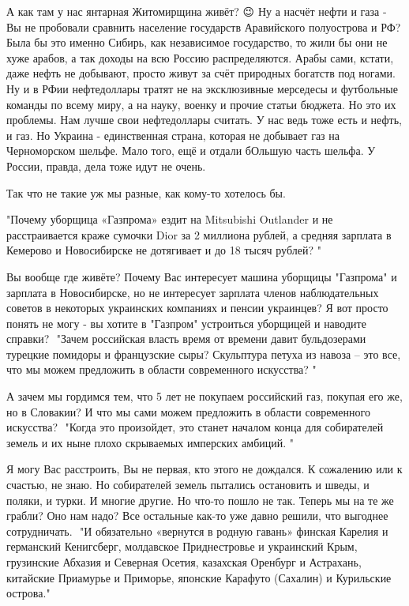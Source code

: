\begin{itemize}
А как там у нас янтарная Житомирщина живёт? 😉 Ну а насчёт нефти и газа - Вы не
пробовали сравнить население государств Аравийского полуострова и РФ? Была бы
это именно Сибирь, как независимое государство, то жили бы они не хуже арабов,
а так доходы на всю Россию распределяются. Арабы сами, кстати, даже нефть не
добывают, просто живут за счёт природных богатств под ногами. Ну и в РФии
нефтедоллары тратят не на эксклюзивные мерседесы и футбольные команды по всему
миру, а на науку, военку и прочие статьи бюджета. Но это их проблемы. Нам лучше
свои нефтедоллары считать. У нас ведь тоже есть и нефть, и газ. Но Украина -
единственная страна, которая не добывает газ на Черноморском шельфе. Мало того,
ещё и отдали бОльшую часть шельфа. У России, правда, дела тоже идут не очень.

Так что не такие уж мы разные, как кому-то хотелось бы.  ⁠

"Почему уборщица «Газпрома» ездит на Mitsubishi Outlander и не расстраивается краже сумочки Dior за 2 миллиона рублей, а средняя зарплата в Кемерово и Новосибирске не дотягивает и до 18 тысяч рублей? "

Вы вообще где живёте? Почему Вас интересует машина уборщицы "Газпрома" и
зарплата в Новосибирске, но не интересует зарплата членов наблюдательных
советов в некоторых украинских компаниях и пенсии украинцев? Я вот просто
понять не могу - вы хотите в "Газпром" устроиться уборщицей и наводите справки?
⁠
"Зачем российская власть время от времени давит бульдозерами турецкие помидоры
и французские сыры? Скульптура петуха из навоза – это все, что мы можем
предложить в области современного искусства? "

А зачем мы гордимся тем, что 5 лет не покупаем российский газ, покупая его же,
но в Словакии? И что мы сами можем предложить в области современного искусства?
⁠
"Когда это произойдет, это станет началом конца для собирателей земель и их
ныне плохо скрываемых имперских амбиций. "

Я могу Вас расстроить, Вы не первая, кто этого не дождался. К сожалению или к
счастью, не знаю. Но собирателей земель пытались остановить и шведы, и поляки,
и турки. И многие другие. Но что-то пошло не так. Теперь мы на те же грабли?
Оно нам надо? Все остальные как-то уже давно решили, что выгоднее сотрудничать.
⁠
"И обязательно «вернутся в родную гавань» финская Карелия и германский
Кенигсберг, молдавское Приднестровье и украинский Крым, грузинские Абхазия и
Северная Осетия, казахская Оренбург и Астрахань, китайские Приамурье и
Приморье, японские Карафуто (Сахалин) и Курильские острова."


\end{itemize}
